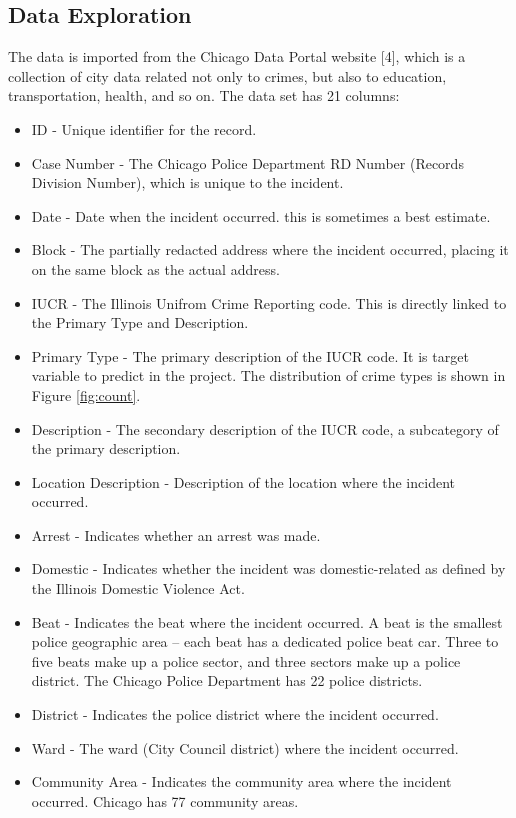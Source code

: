 \documentclass[12pt]{article}
\begin{document}
\subsection{Data Exploration}
The data is imported from the Chicago Data Portal website [4], which is a collection of city data related not only to crimes, but also to education, transportation, health, and so on.
The data set has 21 columns:
\begin{itemize}
\item ID - Unique identifier for the record.
\item Case Number - The Chicago Police Department RD Number (Records Division Number), which is unique to the incident.
\item Date - Date when the incident occurred. this is sometimes a best estimate.
\item Block - The partially redacted address where the incident occurred, placing it on the same block as the actual address.
\item IUCR - The Illinois Unifrom Crime Reporting code. This is directly linked to the Primary Type and Description.
\item Primary Type - The primary description of the IUCR code. It is target variable to predict in the project. The distribution of crime types is shown in Figure \ref{fig:count}.
\item Description - The secondary description of the IUCR code, a subcategory of the primary description.
\item Location Description - Description of the location where the incident occurred.
\item Arrest - Indicates whether an arrest was made.
\item Domestic - Indicates whether the incident was domestic-related as defined by the Illinois Domestic Violence Act.
\item Beat - Indicates the beat where the incident occurred. A beat is the smallest police geographic area – each beat has a dedicated police beat car. Three to five beats make up a police sector, and three sectors make up a police district. The Chicago Police Department has 22 police districts.
\item District - Indicates the police district where the incident occurred.
\item Ward - The ward (City Council district) where the incident occurred.
\item Community Area - Indicates the community area where the incident occurred. Chicago has 77 community areas.

\end{itemize}
\end{document}
